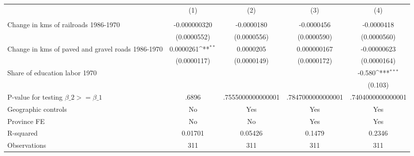 {
\def\sym#1{\ifmmode^{#1}\else\(^{#1}\)\fi}
\begin{tabular}{l*{4}{c}}
\hline\hline
                &\multicolumn{1}{c}{(1)}&\multicolumn{1}{c}{(2)}&\multicolumn{1}{c}{(3)}&\multicolumn{1}{c}{(4)}\\
                &\multicolumn{1}{c}{}&\multicolumn{1}{c}{}&\multicolumn{1}{c}{}&\multicolumn{1}{c}{}\\
\hline
Change in kms of railroads 1986-1970&-0.000000320         &-0.0000180         &-0.0000456         &-0.0000418         \\
                &(0.0000552)         &(0.0000556)         &(0.0000590)         &(0.0000560)         \\
[1em]
Change in kms of paved and gravel roads 1986-1970&0.0000261\sym{**} &0.0000205         &0.000000167         &-0.00000623         \\
                &(0.0000117)         &(0.0000149)         &(0.0000172)         &(0.0000164)         \\
[1em]
Share of education labor 1970&                  &                  &                  &   -0.580\sym{***}\\
                &                  &                  &                  &  (0.103)         \\
\hline
P-value for testing $\beta\_{2} >= \beta\_{1}$&    .6896         &.7555000000000001         &.7847000000000001         &.7404000000000001         \\
Geographic controls&       No         &      Yes         &      Yes         &      Yes         \\
Province FE     &       No         &       No         &      Yes         &      Yes         \\
R-squared       &  0.01701         &  0.05426         &   0.1479         &   0.2346         \\
Observations    &      311         &      311         &      311         &      311         \\
\hline\hline
\end{tabular}
}
